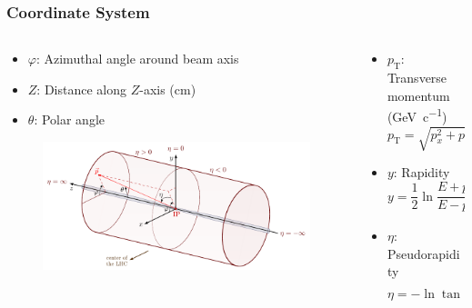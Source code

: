 \documentclass[11pt]{beamer}
\begin{document}
\begin{frame}
    \frametitle{Coordinate System}

    \begin{columns}[t]
        \begin{column}{0.6\textwidth}
            \begin{itemize}
                \item $\varphi$: Azimuthal angle around beam axis
                \item $Z$: Distance along $Z$-axis (\unit{\centi\metre})
                \item $\theta$: Polar angle
            \end{itemize}
            \begin{figure}[h]
                \begin{center}
                    \includegraphics[width=\textwidth]{Figs/coords.pdf}
                \end{center}
            \end{figure}
        \end{column}

        \begin{column}{0.4\textwidth}
            \begin{itemize}
                \item $p_{\mathrm{T}}$: Transverse momentum (\unit{\giga\electronvolt\per c})
                \begin{equation*}
                    p_{\mathrm{T}}=\sqrt{p_x^2+p_y^2}
                \end{equation*}
                \item $y$: Rapidity
                \begin{equation*}
                    y=\frac{1}{2}\ln \frac{E+p_z}{E-p_z}
                \end{equation*}
                \item $\eta$: Pseudorapidity
                \begin{equation*}
                    \eta=-\ln\tan\frac{\theta}{2}
                \end{equation*}
            \end{itemize}
        \end{column}
    \end{columns}

\end{frame}
\end{document}
